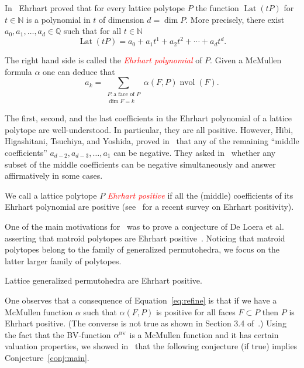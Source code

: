 \documentclass[ALCO,ThmDefs,Unicode,epreuves]{cedram}
\newcommand{\important}[1]{\emph{\textcolor{red}{#1}}}
\DeclareMathOperator{\Lat}{Lat}
\DeclareMathOperator{\nvol}{nvol}
\newcommand{\bv}{\alpha^{\textsc{bv}}}
\newcommand{\NN}{{\mathbb{N}}}
\begin{document}
In~\cite{ehrhart} Ehrhart proved that for every lattice polytope $P$ the function $\Lat(tP)$ for $t\in \NN$ is a polynomial in $t$ of dimension $d=\dim P.$ More precisely, there exist $a_0, a_1, \dots, a_d \in\mathbb{Q}$ such that for all $t \in \NN$
\[
\Lat(tP) = a_0+a_1t^1+a_2t^2+\cdots+a_dt^d.
\]

The right hand side is called the \important{Ehrhart polynomial} of $P$. Given a McMullen formula $\alpha$ one can deduce that 
\begin{equation}\label{eq:refine}
a_k = \sum_{\substack{F: \text{a face of $P$} \\\dim F=k}}\alpha(F,P) \nvol(F). 
\end{equation}

The first, second, and the last coefficients in the Ehrhart polynomial of a lattice polytope are well-understood. In particular, they are all positive. However, Hibi, Higashitani, Tsuchiya, and Yoshida, proved in~\cite{negative} that any of the remaining ``middle coefficients'' $a_{d-2}, a_{d-3}, \dots, a_1$ can be negative. They asked in~\cite[Question~3.1]{negative} whether any subset of the middle coefficients can be negative simultaneously and answer affirmatively in some cases.

We call a lattice polytope $P$ \important{Ehrhart positive} if all the (middle) coefficients of its Ehrhart polynomial are positive (see~\cite{positivesurvey} for a recent survey on Ehrhart positivity). 

One of the main motivations for~\cite{bvalpha} was to prove a conjecture of De Loera et al. asserting that matroid polytopes are Ehrhart positive~\cite{deloera}. 
Noticing that matroid polytopes belong to the family of generalized permutohedra, we focus on the latter larger family of polytopes.
\begin{conj}\label{conj:main}
	Lattice generalized permutohedra are Ehrhart positive.
\end{conj}

One observes that a consequence of Equation~\eqref{eq:refine} is that if we have a McMullen function $\alpha$ such that $\alpha(F,P)$ is positive for all faces $F\subset P$ then $P$ is Ehrhart positive. (The converse is not true as shown in Section 3.4 of~\cite{nill}.) Using the fact that the BV-function $\bv$ is a McMullen function and it has certain valuation properties, we showed in~\cite{bvalpha} that the following conjecture (if true) implies Conjecture~\ref{conj:main}.
\end{document}
